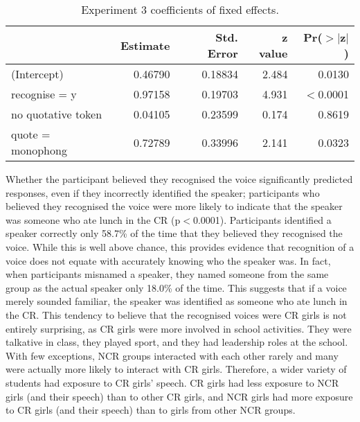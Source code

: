 \begin{table}[ht]
\begin{center}
\begin{tabular}{lrrrr}
  \hline
  & Estimate & Std. Error & z value & Pr($>$$|$z$|$) \\  
  \hline
(Intercept) & 0.46790  &  0.18834  & 2.484  & 0.0130 \\
  recognise = y &  0.97158  &  0.19703 &  4.931 & $<$0.0001 \\
  no quotative token &  0.04105  &  0.23599  & 0.174  & 0.8619 \\
  quote = monophong &  0.72789  &  0.33996 &  2.141 &  0.0323 \\
   \hline
\end{tabular}
\caption{Experiment 3 coefficients of fixed effects.}\label{coeff3}
\end{center}
\end{table}

Whether the participant believed they recognised the voice significantly predicted responses, even if they incorrectly identified the speaker; participants who believed they recognised the voice were more likely to indicate that the speaker was someone who ate lunch in the CR (p$<$0.0001).  Participants identified a speaker correctly only 58.7\% of the time that they believed they recognised the voice.  While this is well above chance, this provides evidence that recognition of a voice does not equate with accurately knowing who the speaker was.  In fact, when participants misnamed a speaker, they named someone from the same group as the actual speaker only 18.0\% of the time.  This suggests that if a voice merely sounded familiar, the speaker was identified as someone who ate lunch in the CR.  This tendency to believe that the recognised voices were CR girls is not entirely surprising, as CR girls were more involved in school activities.  They were talkative in class, they played sport, and they had leadership roles at the school.  With few exceptions, NCR groups interacted with each other rarely and many were actually more likely to interact with CR girls.  Therefore, a wider variety of students had exposure to CR girls' speech.  CR girls had less exposure to NCR girls (and their speech) than to other CR girls, and NCR girls had more exposure to CR girls (and their speech) than to girls from other NCR groups.  


